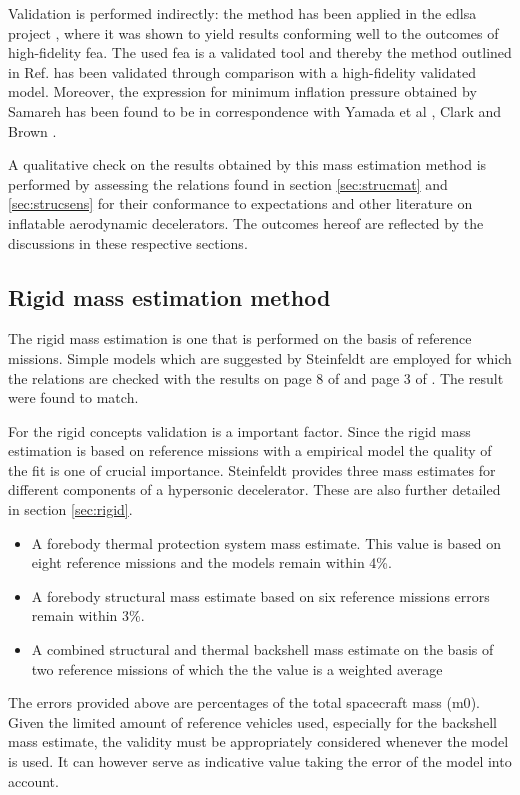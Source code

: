 Validation is performed indirectly: the method \cite{Samareh2011} has been applied in the \gls{edlsa} project \cite{Cianciolo2010}, where it was shown to yield results conforming well to the outcomes of high-fidelity \gls{fea}. The used \gls{fea} is a validated tool \cite{Cianciolo2010} and thereby the method outlined in Ref.\cite{Samareh2011} has been validated through comparison with a high-fidelity validated model. Moreover, the expression for minimum inflation pressure obtained by Samareh has been found to be in correspondence with Yamada et al \cite{Yamada2009}, Clark \cite{Clark2009} and Brown \cite{Brown2009}.

A qualitative check on the results obtained by this mass estimation method is performed by assessing the relations found in section \ref{sec:strucmat} and \ref{sec:strucsens} for their conformance to expectations and other literature on inflatable aerodynamic decelerators. The outcomes hereof are reflected by the discussions in these respective sections.


\subsection{Rigid mass estimation method}
The rigid mass estimation is one that is performed on the basis of reference missions. Simple models which are suggested by Steinfeldt \cite{Steinfeldt2009} are employed for which the relations are checked with the results on page 8 of \cite{Steinfeldt2009} and page 3 of \cite{Laub2004}. The result were found to match.

For the rigid concepts validation is a important factor. Since the rigid mass estimation is based on reference missions with a empirical model the quality of the fit is one of crucial importance.
Steinfeldt provides three mass estimates for different components of a hypersonic decelerator. These are also further detailed in section \ref{sec:rigid}.

\begin{itemize}
\item A forebody thermal protection system mass estimate. This value is based on eight reference missions and the models remain within 4\%.
\item A forebody structural mass estimate based on six reference missions errors remain within 3\%.
\item A combined structural and thermal backshell mass estimate on the basis of two reference missions of which the the value is a weighted average
\end{itemize}

The errors provided above are percentages of the total spacecraft mass (\gls{m0}). Given the limited amount of reference vehicles used, especially for the backshell mass estimate, the validity must be appropriately considered whenever the model is used. It can however serve as indicative value taking the error of the model into account.
